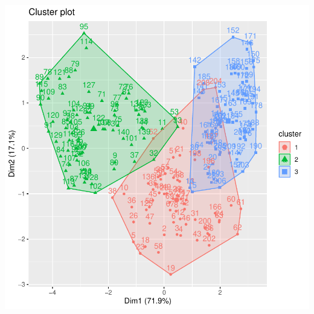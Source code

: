 \documentclass [a4paper] {article}
\begin{document}
\begin{center}
\begin{Schunk}
\begin{Sinput}
\end{Sinput}
\end{Schunk}
\includegraphics{entrega-jerarquica_acendente_media_plot}
\end{center}
\end{document}
